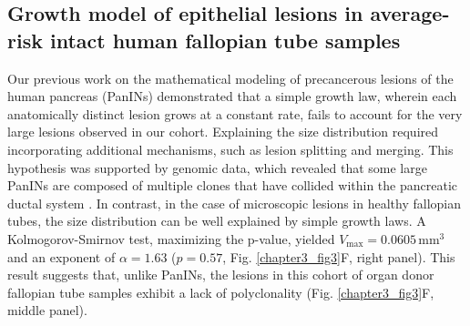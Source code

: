 \begin{refsection}
    \subsection{Growth model of epithelial lesions in average-risk intact human fallopian tube samples}
    Our previous work on the mathematical modeling of precancerous lesions of the human pancreas (PanINs) demonstrated that a simple growth law, wherein each anatomically distinct lesion grows at a constant rate, fails to account for the very large lesions observed in our cohort\cite{Power}. Explaining the size distribution required incorporating additional mechanisms, such as lesion splitting and merging. This hypothesis was supported by genomic data, which revealed that some large PanINs are composed of multiple clones that have collided within the pancreatic ductal system\cite{Braxton20243D} . In contrast, in the case of microscopic lesions in healthy fallopian tubes, the size distribution can be well explained by simple growth laws. A Kolmogorov-Smirnov test, maximizing the p-value, yielded \(V_\text{max} = 0.0605 \, \text{mm}^3\) and an exponent of \(\alpha = 1.63\) (\(p = 0.57\), Fig. \ref{chapter3_fig3}F, right panel). This result suggests that, unlike PanINs, the lesions in this cohort of organ donor fallopian tube samples exhibit a lack of polyclonality (Fig. \ref{chapter3_fig3}F, middle panel).
    

\end{refsection}
